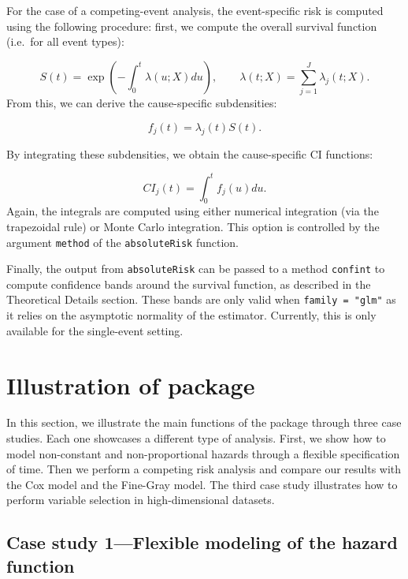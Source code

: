 For the case of a competing-event analysis, the event-specific risk is computed using the following procedure: first, we compute the overall survival function (i.e.~for all event types):

\[ S(t) = \exp\left(-\int_0^t \lambda(u;X) du\right),\qquad \lambda(t;X) = \sum_{j=1}^J \lambda_j(t;X).\]
From this, we can derive the cause-specific subdensities:

\[ f_j(t) = \lambda_j(t)S(t).\]

By integrating these subdensities, we obtain the cause-specific CI functions:

\[ CI_j(t) = \int_0^t f_j(u)du.\]
Again, the integrals are computed using either numerical integration (via the trapezoidal rule) or Monte Carlo integration. This option is controlled by the argument \texttt{method} of the \texttt{absoluteRisk} function.

Finally, the output from \texttt{absoluteRisk} can be passed to a method \texttt{confint} to compute confidence bands around the survival function, as described in the Theoretical Details section. These bands are only valid when \texttt{family\ =\ "glm"} as it relies on the asymptotic normality of the estimator. Currently, this is only available for the single-event setting.

\hypertarget{illustration-of-package}{%
\section{Illustration of package}\label{illustration-of-package}}

In this section, we illustrate the main functions of the  package through three case studies. Each one showcases a different type of analysis. First, we show how to model non-constant and non-proportional hazards through a flexible specification of time. Then we perform a competing risk analysis and compare our results with the Cox model and the Fine-Gray model. The third case study illustrates how to perform variable selection in high-dimensional datasets.

\hypertarget{case-study-1flexible-modeling-of-the-hazard-function}{%
\subsection{Case study 1---Flexible modeling of the hazard function}\label{case-study-1flexible-modeling-of-the-hazard-function}}

